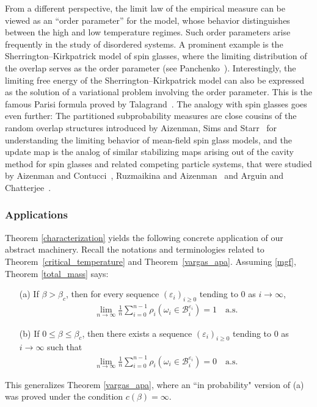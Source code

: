 \documentclass[11pt,reqno]{amsart}
\numberwithin{equation}{section}
\theoremstyle{definition}
\begin{document}
From a different perspective, the limit law of the empirical measure can be viewed as an ``order parameter'' for the model, whose behavior distinguishes between the high and low temperature regimes. Such order parameters arise frequently in the study of disordered systems. A prominent example is the Sherrington--Kirkpatrick model of spin glasses, where the limiting distribution of the overlap serves as the order parameter (see Panchenko~\cite{panchenko13}). Interestingly, the limiting free energy of the Sherrington--Kirkpatrick model can also be expressed as the solution of a variational problem involving the order parameter. This is the famous Parisi formula proved by Talagrand~\cite{talagrand06}. The analogy with spin glasses goes even further: The partitioned subprobability measures are close cousins of the random overlap structures introduced by Aizenman, Sims and Starr~\cite{ass07} for understanding the limiting behavior of mean-field spin glass models, and the update map is the analog of similar stabilizing maps arising out of the cavity method for spin glasses and related competing particle systems, that were studied by Aizenman and Contucci~\cite{aizenman-contucci98}, Ruzmaikina and Aizenman~\cite{ruzmaikina-aizenman05} and Arguin and Chatterjee~\cite{arguin-chatterjee13}.

\subsubsection{Applications}
Theorem \ref{characterization} yields the following concrete application of our abstract machinery. Recall the notations and terminologies related to Theorem~\ref{critical_temperature} and Theorem~\ref{vargas_apa}. Assuming \eqref{mgf}, Theorem \ref{total_mass} says: 
\begin{itemize}
\item[(a)] If $\beta > \beta_c$, then for every sequence $({\varepsilon}_i)_{i \geq 0}$ tending to 0 as $i \to \infty$,
{\begin{align*} {
\lim_{n \to \infty} \frac{1}{n} \sum_{i = 0}^{n-1} \rho_{i}(\omega_i \in {\mathcal{B}}_i^{{\varepsilon}_i}) = 1 \quad \mathrm{a.s.}
} \end{align*}}
\item[(b)] If $0\le \beta \le \beta_c$, then there exists a sequence $({\varepsilon}_i)_{i \geq 0}$ tending to 0 as $i \to \infty$ such that
{\begin{align*} {
\lim_{n \to \infty} \frac{1}{n} \sum_{i = 0}^{n-1} \rho_{i}(\omega_i \in {\mathcal{B}}_i^{{\varepsilon}_i}) = 0 \quad \mathrm{a.s.}
} \end{align*}}
\end{itemize}
This generalizes Theorem \ref{vargas_apa}, where an ``in probability" version of (a) was proved under the condition $c(\beta)=\infty$. 
\end{document}

